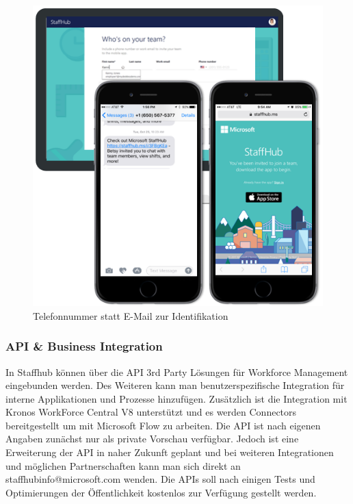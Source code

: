 \begin{figure}[H] 
\centering 
\includegraphics[scale=0.82]{images/invite} 
\caption[Telefonnummer statt E-Mail zur Identifikation]{Telefonnummer statt E-Mail zur Identifikation\protect} 
\label{ws} 
\end{figure}

\subsubsection{API \& Business Integration}

In Staffhub können über die API 3rd Party Lösungen für Workforce Management eingebunden werden. Des Weiteren kann man benutzerspezifische Integration für interne Applikationen und Prozesse hinzufügen. Zusätzlich ist die Integration mit Kronos WorkForce Central V8 unterstützt und es werden Connectors bereitgestellt um mit Microsoft Flow zu arbeiten.
Die API ist nach eigenen Angaben zunächst nur als private Vorschau verfügbar. Jedoch ist eine Erweiterung der API in naher Zukunft geplant und bei weiteren Integrationen und möglichen Partnerschaften kann man sich direkt an staffhubinfo@microsoft.com wenden. Die APIs soll nach einigen Tests und Optimierungen der Öffentlichkeit kostenlos zur Verfügung gestellt werden.

